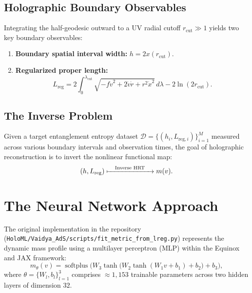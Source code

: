 \documentclass[11pt,a4paper]{article}
\begin{document}
\subsection{Holographic Boundary Observables}
Integrating the half-geodesic outward to a UV radial cutoff $r_{\mathrm{cut}} \gg 1$ yields two key boundary observables:
\begin{enumerate}
    \item \textbf{Boundary spatial interval width:} $h = 2 x(r_{\mathrm{cut}})$.
    \item \textbf{Regularized proper length:}
    \begin{equation}
        L_{\mathrm{reg}} = 2 \int_0^{\lambda_{\mathrm{cut}}} \sqrt{-f \dot{v}^2 + 2 \dot{v} \dot{r} + r^2 \dot{x}^2}\, d\lambda - 2 \ln(2 r_{\mathrm{cut}}).
        \label{eq:Lreg}
    \end{equation}
\end{enumerate}

\subsection{The Inverse Problem}
Given a target entanglement entropy dataset $\mathcal{D} = \{(h_i, L_{\mathrm{reg}, i})\}_{i=1}^M$ measured across various boundary intervals and observation times, the goal of holographic reconstruction is to invert the nonlinear functional map:
\begin{equation}
    (h, L_{\mathrm{reg}}) \xmapsto{\quad \text{Inverse HRT} \quad} m(v).
\end{equation}

\section{The Neural Network Approach}
The original implementation in the repository (\texttt{HoloML/Vaidya\_AdS/scripts/fit\_metric\_from\_lreg.py}) represents the dynamic mass profile using a multilayer perceptron (MLP) within the Equinox and JAX framework:
\begin{equation}
    m_\theta(v) = \operatorname{softplus}\Big( W_3 \tanh\big( W_2 \tanh(W_1 v + b_1) + b_2 \big) + b_3 \Big),
\end{equation}
where $\theta = \{W_l, b_l\}_{l=1}^3$ comprises $\approx 1{,}153$ trainable parameters across two hidden layers of dimension $32$.
\end{document}
